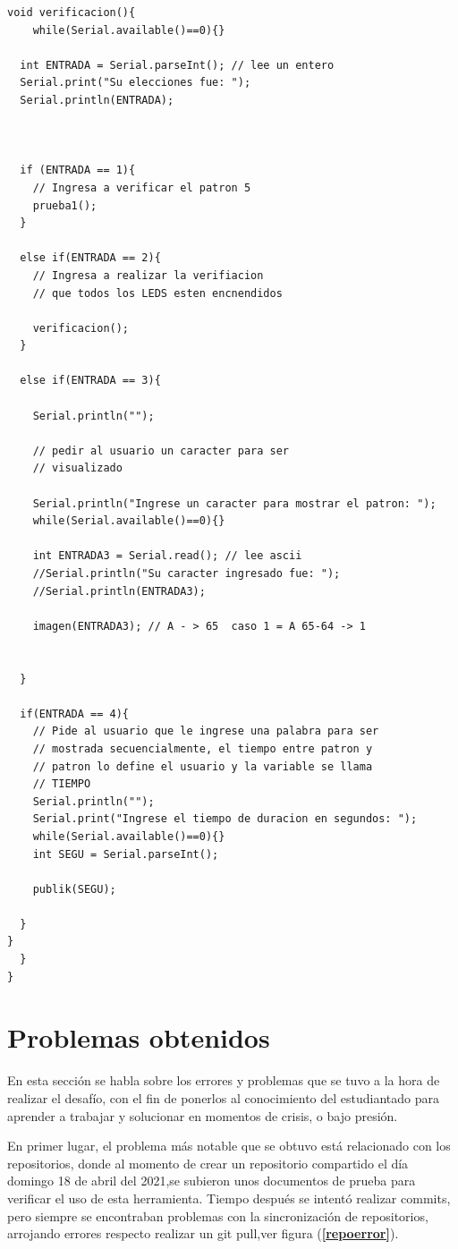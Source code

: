 \documentclass{article}
\begin{document}
\begin{lstlisting}[language=arduino, label=pruebaON]
void verificacion(){ 
    while(Serial.available()==0){}
    
  int ENTRADA = Serial.parseInt(); // lee un entero 
  Serial.print("Su elecciones fue: ");
  Serial.println(ENTRADA);
  
  
  
  if (ENTRADA == 1){
    // Ingresa a verificar el patron 5 
    prueba1();
  }
  
  else if(ENTRADA == 2){
    // Ingresa a realizar la verifiacion
    // que todos los LEDS esten encnendidos
    
    verificacion();
  }
  
  else if(ENTRADA == 3){
   
    Serial.println("");

    // pedir al usuario un caracter para ser
    // visualizado
    
    Serial.println("Ingrese un caracter para mostrar el patron: ");
    while(Serial.available()==0){}
    
  	int ENTRADA3 = Serial.read(); // lee ascii 
  	//Serial.println("Su caracter ingresado fue: ");
  	//Serial.println(ENTRADA3);
    
    imagen(ENTRADA3); // A - > 65  caso 1 = A 65-64 -> 1 

    
  }
  
  if(ENTRADA == 4){
    // Pide al usuario que le ingrese una palabra para ser
    // mostrada secuencialmente, el tiempo entre patron y 
    // patron lo define el usuario y la variable se llama
    // TIEMPO
	Serial.println("");
    Serial.print("Ingrese el tiempo de duracion en segundos: ");
    while(Serial.available()==0){}
    int SEGU = Serial.parseInt(); 
  
	publik(SEGU);
    
  }
}
  }
}
\end{lstlisting}

\section{Problemas obtenidos}\label{problem}
En esta sección se habla sobre los errores y problemas que se tuvo a la hora de realizar el desafío, con el fin de ponerlos al conocimiento del estudiantado para aprender a trabajar y solucionar en momentos de crisis, o bajo presión.

En primer lugar, el problema más notable que se obtuvo está relacionado con los repositorios, donde al momento de crear un repositorio compartido el día domingo 18 de abril del 2021,se subieron unos documentos de prueba para verificar el uso de esta herramienta. Tiempo después se intentó  realizar commits, pero siempre se encontraban problemas con la sincronización de repositorios, arrojando errores respecto realizar un git pull,ver figura (\textbf{\ref{repoerror}}).
\end{document}
